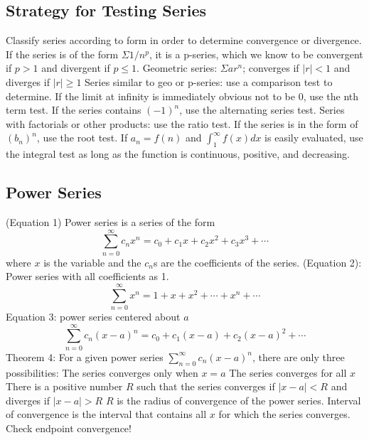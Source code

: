 \documentclass{article}
\begin{document}
        \begin{multicols}{2}
    \subsection{Strategy for Testing Series}
    \begin{outline}
        \1 Classify series according to form in order to determine convergence or divergence. 
        \1 If the series is of the form \(\Sigma 1/n^p\), it is a p-series, which we know to be convergent if \(p>1\) and divergent if \(p\leq 1\).
        \1 Geometric series: \(\Sigma ar^n\); converges if \(|r|<1\) and diverges if \(|r|\geq 1\)
        \1 Series similar to geo or p-series: use a comparison test to determine. 
        \1 If the limit at infinity is immediately obvious not to be 0, use the nth term test. 
        \1 If the series contains \((-1)^n\), use the alternating series test. 
        \1 Series with factorials or other products: use the ratio test. 
        \1 If the series is in the form of \((b_n)^n\), use the root test. 
        \1 If \(a_n=f(n)\) and \(\int^\infty_1f(x)dx\) is easily evaluated, use the integral test as long as the function is continuous, positive, and decreasing. 

    \end{outline}
\end{multicols}
    \subsection{Power Series}
    \begin{outline}
        \1 (Equation 1) Power series is a series of the form \[\sum^\infty_{n=0}c_nx^n=c_0+c_1x+c_2x^2+c_3x^3+\cdots\] where $x$ is the variable and the $c_n$s are the coefficients of the series. 
        \1 (Equation 2): Power series with all coefficients as 1. \[\sum^\infty_{n=0}x^n=1+x+x^2+\cdots+x^n+\cdots\]
        \1 Equation 3: power series centered about $a$ \[\sum^\infty_{n=0}c_n(x-a)^n=c_0+c_1(x-a)+c_2(x-a)^2+\cdots\]
        \1 Theorem 4: For a given power series \(\sum^\infty_{n=0}c_n(x-a)^n\), there are only three possibilities: 
            \2 The series converges only when \(x=a\)
            \2 The series converges for all $x$
            \2 There is a positive number $R$ such that the series converges if \(|x-a|<R\) and diverges if \(|x-a|>R\)
        \1 $R$ is the radius of convergence of the power series. Interval of convergence is the interval that contains all $x$ for which the series converges. 
        \1 Check endpoint convergence!

    \end{outline}
\end{document}
